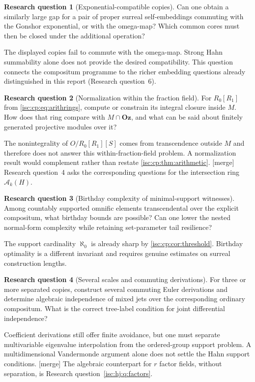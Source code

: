 \documentclass[11pt,letterpaper]{article}
\theoremstyle{definition}
\newtheorem{question}{Research question}
\theoremstyle{remark}
\newcommand{\Oz}{\mathbf{Oz}}
\newcommand{\A}[2]{\mathcal A_{#1}(#2)}
\newcommand{\mtag}{\textup{[merge]}}%
\numberwithin{equation}{section}
\begin{document}
\begin{question}[Exponential-compatible copies]\label{isc:cp:q:exp}
Can one obtain a similarly large gap for a pair of proper surreal
self-embeddings commuting with the Gonshor exponential, or with the
omega-map? Which common cores must then be closed under the additional
operation?
\end{question}
The displayed copies fail to commute with the omega-map. Strong Hahn
summability alone does not provide the desired compatibility. This question
connects the compositum programme to the richer embedding questions already
distinguished in this report (Research question~6).

\begin{question}[Normalization within the fraction field]\label{isc:cp:q:normalization}
For $R_0[R_1]$ from \eqref{isc:cp:eq:arithrings}, compute or constrain its
integral closure inside $M$. How does that ring compare with $M\cap\Oz$, and
what can be said about finitely generated projective modules over it?
\end{question}
The nonintegrality of $O/R_0[R_1][S]$ comes from transcendence outside $M$
and therefore does not answer this within-fraction-field problem. A
normalization result would complement rather than restate
\cref{isc:cp:thm:arithmetic}. \mtag{} Research question~4 asks the
corresponding questions for the intersection ring $\A{k}{H}$.

\begin{question}[Birthday complexity of minimal-support witnesses]\label{isc:cp:q:birthday}
Among countably supported omnific elements transcendental over the explicit
compositum, what birthday bounds are possible? Can one lower the nested
normal-form complexity while retaining set-parameter tail resilience?
\end{question}
The support cardinality $\aleph_0$ is already sharp by
\cref{isc:cp:cor:threshold}. Birthday optimality is a different invariant
and requires genuine estimates on surreal construction lengths.

\begin{question}[Several scales and commuting derivations]\label{isc:cp:q:scales}
For three or more separated copies, construct several commuting Euler
derivations and determine algebraic independence of mixed jets over the
corresponding ordinary compositum. What is the correct tree-label condition
for joint differential independence?
\end{question}
Coefficient derivations still offer finite avoidance, but one must separate
multivariable eigenvalue interpolation from the ordered-group support
problem. A multidimensional Vandermonde argument alone does not settle the
Hahn support conditions. \mtag{} The algebraic counterpart for $r$ factor
fields, without separation, is Research question~\ref{isc:hj:q:factors}.
\end{document}
